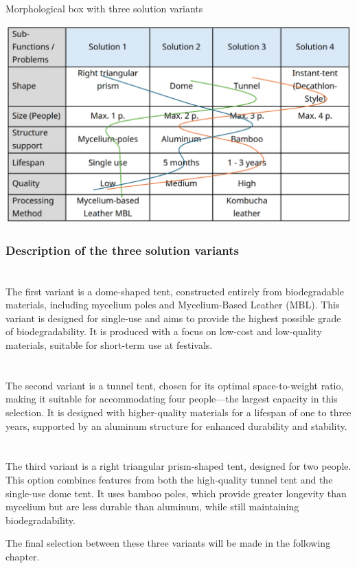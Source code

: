 \documentclass{article}
\newcommand{\pph}[1]{\paragraph{#1} \phantom{}\\}
\begin{document}
\begin{table}[ht!]
    \centering
    \caption{Morphological box with three solution variants}
    \includegraphics[width=.7\textwidth]{media/morph_box.png}
    \label{tab:morph_box}
\end{table}

\subsubsection{Description of the three solution variants}
\pph{\color{newgreen}{Variant 1: Dome tent (Single use, Fully biodegradable)}}
The first variant is a dome-shaped tent, constructed entirely from biodegradable materials,
including mycelium poles and Mycelium-Based Leather (MBL). This variant is designed for
single-use and aims to provide the highest possible grade of biodegradability. It is
produced with a focus on low-cost and low-quality materials, suitable for short-term use
at festivals.

\pph{\color{neworange}{Variant 2: Tunner tent (Four-person, Long-lasting)}}
The second variant is a tunnel tent, chosen for its optimal space-to-weight ratio, making
it suitable for accommodating four people—the largest capacity in this selection. It is
designed with higher-quality materials for a lifespan of one to three years, supported by
an aluminum structure for enhanced durability and stability.

\pph{\color{newblue}{Variant 3: Triangular prism tent (Two-person, Medium-lasting)}}
The third variant is a right triangular prism-shaped tent, designed for two people.
This option combines features from both the high-quality tunnel tent and the single-use
dome tent. It uses bamboo poles, which provide greater longevity than mycelium but are
less durable than aluminum, while still maintaining biodegradability.

The final selection between these three variants will be made in the following chapter.
\end{document}
